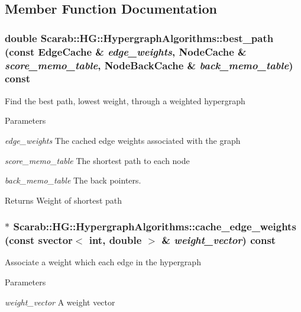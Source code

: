 \subsection{Member Function Documentation}
\hypertarget{classScarab_1_1HG_1_1HypergraphAlgorithms_aa9a28bf42d17a166ec5e780067e33259}{
\subsubsection[{best\_\-path}]{\setlength{\rightskip}{0pt plus 5cm}double Scarab::HG::HypergraphAlgorithms::best\_\-path (const {\bf EdgeCache} \& {\em edge\_\-weights}, \/  {\bf NodeCache} \& {\em score\_\-memo\_\-table}, \/  {\bf NodeBackCache} \& {\em back\_\-memo\_\-table}) const}}
\label{classScarab_1_1HG_1_1HypergraphAlgorithms_aa9a28bf42d17a166ec5e780067e33259}
Find the best path, lowest weight, through a weighted hypergraph 
\begin{DoxyParams}{Parameters}
\item[{\em edge\_\-weights}]The cached edge weights associated with the graph \item[{\em score\_\-memo\_\-table}]The shortest path to each node \item[{\em back\_\-memo\_\-table}]The back pointers. \end{DoxyParams}
\begin{DoxyReturn}{Returns}
Weight of shortest path 
\end{DoxyReturn}
\hypertarget{classScarab_1_1HG_1_1HypergraphAlgorithms_a28f83d7616f6153ca7c909fe82c5b0fa}{
\subsubsection[{cache\_\-edge\_\-weights}]{ $\ast$ Scarab::HG::HypergraphAlgorithms::cache\_\-edge\_\-weights (const svector$<$ int, double $>$ \& {\em weight\_\-vector}) const}}
\label{classScarab_1_1HG_1_1HypergraphAlgorithms_a28f83d7616f6153ca7c909fe82c5b0fa}
Associate a weight which each edge in the hypergraph 
\begin{DoxyParams}{Parameters}
\item[{\em weight\_\-vector}]A weight vector \end{DoxyParams}
